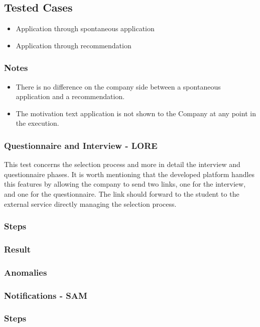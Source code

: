 \subsection*{Tested Cases}
\begin{itemize}
    \item Application through spontaneous application
    \item Application through recommendation
\end{itemize}
\subsubsection*{Notes}
\begin{itemize}
    \item There is no difference on the company side between a spontaneous application and a recommendation. 
    \item The motivation text application is not shown to the Company at any point in the execution.
\end{itemize}
\subsubsection{Questionnaire and Interview - LORE}
This test concerns the selection process and more in detail the interview and questionnaire phases.
It is worth mentioning that the developed platform handles this features by allowing the company to send two links, one for the interview, and one for the questionnaire. The link should forward to the student to the external service directly managing the selection process. 
\subsubsection*{Steps}

\subsubsection*{Result}
\subsubsection*{Anomalies}
\subsubsection{Notifications - SAM}
\subsubsection*{Steps}
